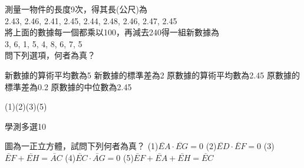 \begin{QUESTIONS}
\begin{QUESTION}
\begin{ExamAnsRateInfo}{}{}{}{}
        \end{ExamAnsRateInfo}
        \begin{QBODY}
            測量一物件的長度9次，得其長(公尺)為\\
            2.43,	2.46,	2.41,	2.45,	2.44,	2.48,	2.46,	2.47,	2.45\\
            將上面的數據每一個都乘以100，再減去240得一組新數據為\\
            3,	6,	1,	5,	4,	8,	6,	7,	5\\
            問下列選項，何者為真？
            \begin{QOPS}
                \QOP 新數據的算術平均數為5
                \QOP 新數據的標準差為2
                \QOP 原數據的算術平均數為2.45
                \QOP 原數據的標準差為0.2
                \QOP 原數據的中位數為2.45
            \end{QOPS}
        \end{QBODY}
        \begin{QFROMS}
        \end{QFROMS}
        \begin{QTAGS}\end{QTAGS}
        \begin{QANS}
            (1)(2)(3)(5)
        \end{QANS}
        \begin{QSOLLIST}
        \end{QSOLLIST}
        \begin{QEMPTYSPACE}
        \end{QEMPTYSPACE}
    \end{QUESTION}
    \begin{QUESTION}
        \begin{ExamInfo}{88}{學測}{多選}{10}
        \end{ExamInfo}
        \begin{ExamAnsRateInfo}{}{}{}{}
        \end{ExamAnsRateInfo}
        \begin{QBODY}
            圖為一正立方體，試問下列何者為真？ %
            (1)$\lvec{EA} \cdot \lvec{EG}=0$
            (2)$\lvec{ED} \cdot \lvec{EF}=0$
            (3)$\lvec{EF}+\lvec{EH}=\lvec{AC}$
            (4)$\lvec{EC} \cdot \lvec{AG}=0$
            (5)$\lvec{EF}+\lvec{EA}+\lvec{EH}=\lvec{EC}$            
        \end{QBODY}
        \begin{QFROMS}
        \end{QFROMS}
        \begin{QTAGS}\end{QTAGS}

\end{QUESTION}
\end{QUESTIONS}
